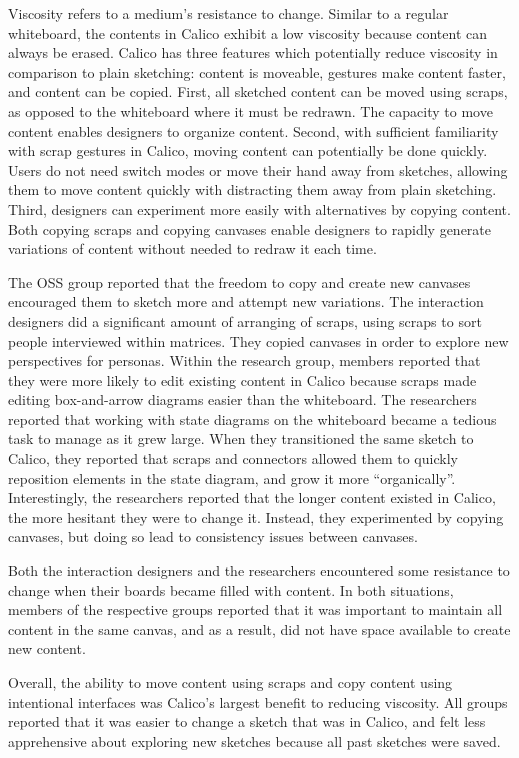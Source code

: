 Viscosity refers to a medium's resistance to change. Similar to a regular whiteboard, the contents in Calico exhibit a low viscosity because content can always be erased. Calico has three features which potentially reduce viscosity in comparison to plain sketching: content is moveable, gestures make content faster, and content can be copied. First, all sketched content can be moved using scraps, as opposed to the whiteboard where it must be redrawn. The capacity to move content enables designers to organize content. Second, with sufficient familiarity with scrap gestures in Calico, moving content can potentially be done quickly. Users do not need switch modes or move their hand away from sketches, allowing them to move content quickly with distracting them away from plain sketching. Third, designers can experiment more easily with alternatives by copying content. Both copying scraps and copying canvases enable designers to rapidly generate variations of content without needed to redraw it each time.

The OSS group reported that the freedom to copy and create new canvases encouraged them to sketch more and attempt new variations. The interaction designers did a significant amount of arranging of scraps, using scraps to sort people interviewed within matrices. They copied canvases in order to explore new perspectives for personas. Within the research group, members reported that they were more likely to edit existing content in Calico because scraps made editing box-and-arrow diagrams easier than the whiteboard. The researchers reported that working with state diagrams on the whiteboard became a tedious task to manage as it grew large. When they transitioned the same sketch to Calico, they reported that scraps and connectors allowed them to quickly reposition elements in the state diagram, and grow it more ``organically''. Interestingly, the researchers reported that the longer content existed in Calico, the more hesitant they were to change it. Instead, they experimented by copying canvases, but doing so lead to consistency issues between canvases.

Both the interaction designers and the researchers encountered some resistance to change when their boards became filled with content. In both situations, members of the respective groups reported that it was important to maintain all content in the same canvas, and as a result, did not have space available to create new content.

Overall, the ability to move content using scraps and copy content using intentional interfaces was Calico's largest benefit to reducing viscosity. All groups reported that it was easier to change a sketch that was in Calico, and felt less apprehensive about exploring new sketches because all past sketches were saved.

